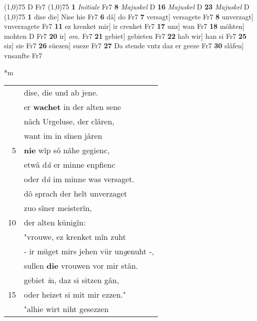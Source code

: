 \documentclass[8pt,a4paper,notitlepage]{article}
\begin{document}
\begin{table}[ht]
\begin{minipage}[t]{0.5\linewidth}
\begin{tabular}{rl}
\end{tabular}
\scriptsize
\line(1,0){75} \newline
D Fr7 \newline
\line(1,0){75} \newline
\textbf{1} \textit{Initiale} Fr7  \textbf{8} \textit{Majuskel} D  \textbf{16} \textit{Majuskel} D  \textbf{23} \textit{Majuskel} D  \newline
\line(1,0){75} \newline
\textbf{1} dise die] Nise hie Fr7 \textbf{6} dâ] do Fr7 \textbf{7} versagt] versagete Fr7 \textbf{8} unverzagt] vnverzagete Fr7 \textbf{11} ez krenket mir] ir crenket Fr7 \textbf{17} unz] wan Fr7 \textbf{18} möhten] mohten D Fr7 \textbf{20} ir] \textit{om.} Fr7 \textbf{21} gebiet] gebieten Fr7 \textbf{22} hab wir] han si Fr7 \textbf{25} siz] sie Fr7 \textbf{26} süezen] sueze Fr7 \textbf{27} Da stende vntz daz er geeze Fr7 \textbf{30} slâfen] vnsanfte Fr7 \newline
\end{minipage}
\hspace{0.5cm}
\begin{minipage}[t]{0.5\linewidth}
\small
\begin{center}*m
\end{center}
\begin{tabular}{rl}
 & dise, die und ab jene.\\ 
 & er \textbf{wachet} in der alten sene\\ 
 & nâch Urgeluse, der clâren,\\ 
 & want im in sînen jâren\\ 
5 & \textbf{nie} wîp sô nâhe gegienc,\\ 
 & etwâ d\textit{â} er minne enpfienc\\ 
 & oder d\textit{â} im minne was versaget.\\ 
 & dô sprach der helt unverzaget\\ 
 & zuo sîner meisterîn,\\ 
10 & der alten künigîn:\\ 
 & "vrouwe, ez krenket mîn zuht\\ 
 & - ir müget mirs jehen vür un\textit{g}enuht -,\\ 
 & sullen \textbf{die} vrouwen vor mir stân.\\ 
 & gebiet \textit{i}n, daz si sitzen gân,\\ 
15 & oder heizet si mit mir ezzen."\\ 
 & "alhie wirt niht gesezzen\\ 

\end{tabular}
\end{minipage}
\end{table}
\end{document}
